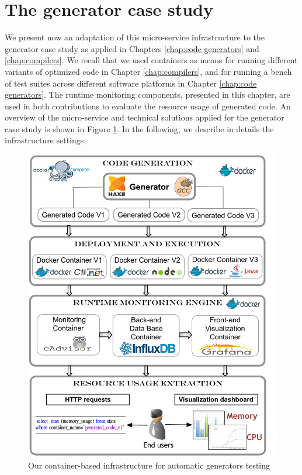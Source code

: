 \section{The generator case study}
\label{mon:case study}
We present now an adaptation of this micro-service infrastructure to the generator case study as applied in Chapters \ref{chap:code generators} and \ref{chap:compilers}. We recall that we used containers as means for running different variants of optimized code in Chapter \ref{chap:compilers}, and for running a bench of test suites across different software platforms in Chapter \ref{chap:code generators}. 
The runtime monitoring components, presented in this chapter, are used in both contributions to evaluate the resource usage of generated code. 
An overview of the micro-service and technical solutions applied for the generator case study is shown in Figure \ref{mon:infra}. In the following, we describe in details the infrastructure settings:
\begin{figure}[h]
	\centering
	\includegraphics[width=0.73\linewidth]{chapitre5/fig/infra_summary}
	\caption{Our container-based infrastructure for automatic generators testing}
	\label{mon:infra}
\end{figure}


